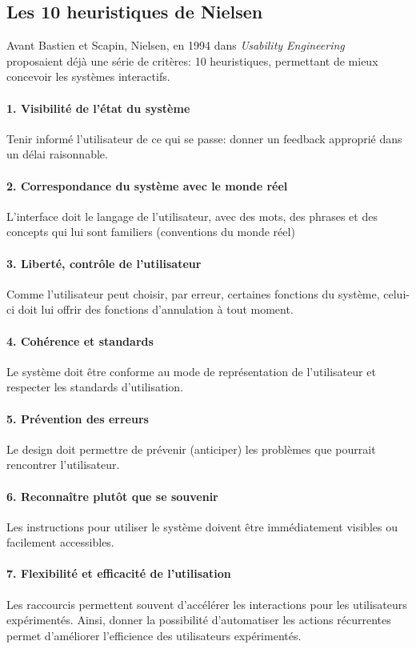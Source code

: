     \subsection{Les 10 heuristiques de Nielsen}
        Avant Bastien et Scapin, Nielsen, en 1994 dans \textit{Usability Engineering}~\cite{nielsen1994usability} proposaient déjà une série de critères: 10 heuristiques, permettant de mieux concevoir les systèmes interactifs.
        \paragraph{1. Visibilité de l’état du système}
            Tenir informé l’utilisateur de ce qui se passe: donner un feedback approprié dans un délai raisonnable.
        \paragraph{2. Correspondance du système avec le monde réel}
            L'interface doit  le langage de l’utilisateur, avec des mots, des phrases et des concepts qui lui sont familiers (conventions du monde réel)
        \paragraph{3. Liberté, contrôle de l’utilisateur}
            Comme l'utilisateur peut choisir, par erreur, certaines fonctions du système, celui-ci doit lui offrir des fonctions d’annulation à tout moment.
        \paragraph{4. Cohérence et standards}
            Le système doit être conforme au mode de représentation de l’utilisateur et respecter les standards d’utilisation.
        \paragraph{5. Prévention des erreurs}
            Le design doit permettre de prévenir (anticiper) les problèmes que pourrait rencontrer l’utilisateur.
        \paragraph{6. Reconnaître plutôt que se souvenir}
            Les instructions pour utiliser le système doivent être immédiatement visibles ou facilement accessibles.
        \paragraph{7. Flexibilité et efficacité de l’utilisation}
            Les raccourcis  permettent souvent d’accélérer les interactions pour les utilisateurs expérimentés. Ainsi, donner la possibilité d’automatiser les actions récurrentes permet d'améliorer l'efficience des utilisateurs expérimentés. 
